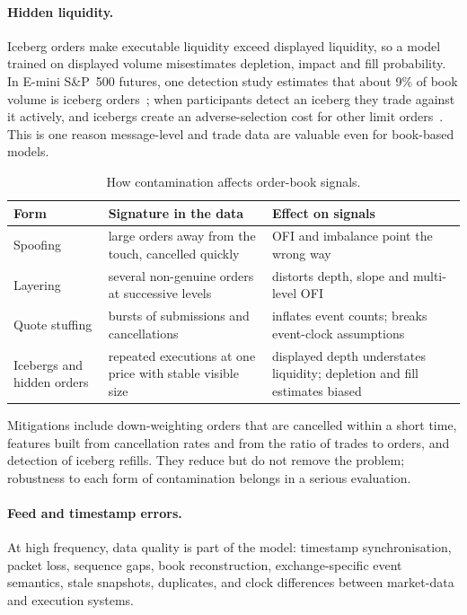 \paragraph{Hidden liquidity.} Iceberg orders make executable liquidity exceed displayed liquidity,
so a model trained on displayed volume misestimates depletion, impact and fill probability. In
E-mini S\&P~500 futures, one detection study estimates that about 9\% of book volume is iceberg
orders~\citep{christensen2013}; when participants detect an iceberg they trade against it actively, and
icebergs create an adverse-selection cost for other limit orders~\citep{frey2017iceberg}. This is one
reason message-level and trade data are valuable even for book-based models.

\begin{table}[!htbp]
\centering\footnotesize
\caption{How contamination affects order-book signals.}
\label{tab:contamination}
\begin{tabularx}{\linewidth}{l>{\raggedright\arraybackslash}X>{\raggedright\arraybackslash}X}
\toprule
Form & Signature in the data & Effect on signals \\
\midrule
Spoofing & large orders away from the touch, cancelled quickly & OFI and imbalance point the wrong way \\
Layering & several non-genuine orders at successive levels & distorts depth, slope and multi-level OFI \\
Quote stuffing & bursts of submissions and cancellations & inflates event counts; breaks event-clock assumptions \\
Icebergs and hidden orders & repeated executions at one price with stable visible size & displayed depth understates liquidity; depletion and fill estimates biased \\
\bottomrule
\end{tabularx}
\end{table}

Mitigations include down-weighting orders that are cancelled within a short time, features built from
cancellation rates and from the ratio of trades to orders, and detection of iceberg refills. They reduce
but do not remove the problem; robustness to each form of contamination belongs in a serious
evaluation.

\paragraph{Feed and timestamp errors.} At high frequency, data quality is part of the model:
timestamp synchronisation, packet loss, sequence gaps, book reconstruction, exchange-specific event
semantics, stale snapshots, duplicates, and clock differences between market-data and execution
systems.

